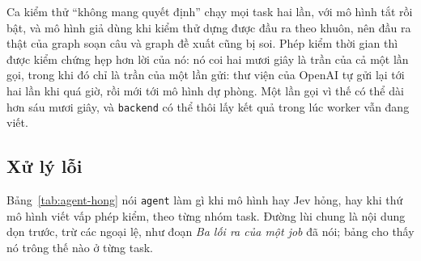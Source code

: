 Ca kiểm thử ``không mang quyết định'' chạy mọi task hai lần, với mô hình tắt rồi bật, và mô hình giả
dùng khi kiểm thử dựng được đầu ra theo khuôn, nên đầu ra thật của graph soạn câu và graph đề xuất
cũng bị soi. Phép kiểm thời gian thì được kiểm chứng hẹp hơn lời của nó: nó coi hai mươi
giây là trần của cả một lần gọi, trong khi đó chỉ là trần của một lần gửi: thư viện của OpenAI tự
gửi lại tới hai lần khi quá giờ, rồi mới tới mô hình dự phòng. Một lần gọi vì thế có thể dài hơn sáu
mươi giây, và \texttt{backend} có thể thôi lấy kết quả trong lúc worker vẫn đang viết.

\subsection{Xử lý lỗi}

Bảng~\ref{tab:agent-hong} nói \texttt{agent} làm gì khi mô hình hay Jev hỏng, hay khi thứ mô hình
viết vấp phép kiểm, theo từng nhóm task. Đường lùi chung là nội dung dọn trước, trừ các ngoại lệ, như
đoạn \emph{Ba lối ra của một job} đã nói; bảng cho thấy nó trông thế nào ở từng task.

